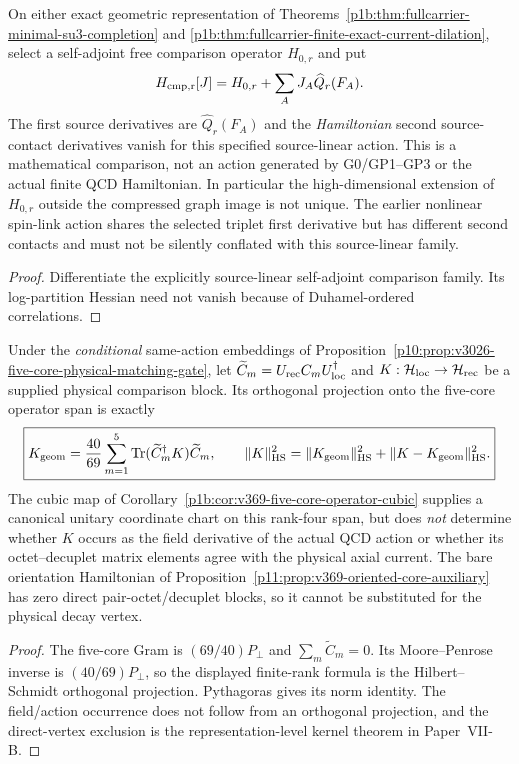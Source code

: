\documentclass[12pt,a4paper]{article}
\begin{document}
\begin{proposition}
\label{p10:prop:fullcarrier-comparison-action-families}
On either exact geometric representation of
Theorems~\ref{p1b:thm:fullcarrier-minimal-su3-completion} and
\ref{p1b:thm:fullcarrier-finite-exact-current-dilation}, select a
self-adjoint free comparison operator $H_{0,r}$ and put
\[
 H_{\rm cmp,r}[J]=H_{0,r}+\sum_AJ_A\widehat Q_r(F_A).
\]
The first source derivatives are $\widehat Q_r(F_A)$ and the
\emph{Hamiltonian} second source-contact derivatives vanish for this
specified source-linear action.  This is a mathematical comparison,
not an action generated by G0/GP1--GP3 or the actual finite QCD
Hamiltonian.  In particular the high-dimensional extension of
$H_{0,r}$ outside the compressed graph image is not unique.
The earlier nonlinear spin-link action shares the selected triplet
first derivative but has different second contacts and must not be
silently conflated with this source-linear family.
\end{proposition}
\begin{proof}
Differentiate the explicitly source-linear self-adjoint comparison
family.  Its log-partition Hessian need not vanish because of
Duhamel-ordered correlations.
\end{proof}

\begin{proposition}
\label{p10:prop:v369-cubic-five-core-projection-firewall}
Under the \emph{conditional} same-action embeddings of
Proposition~\ref{p10:prop:v3026-five-core-physical-matching-gate},
let $\widetilde C_m=U_{\rm rec}C_mU_{\rm loc}^\dagger$ and
$K:\mathcal H_{\rm loc}\to\mathcal H_{\rm rec}$ be a supplied
physical comparison block.  Its orthogonal projection onto the
five-core operator span is exactly
\[
 \boxed{K_{\rm geom}={40\over69}\sum_{m=1}^{5}
 \operatorname{Tr}(\widetilde C_m^\dagger K)\widetilde C_m,\qquad
 \|K\|_{\rm HS}^2=\|K_{\rm geom}\|_{\rm HS}^2
 +\|K-K_{\rm geom}\|_{\rm HS}^2.}
\]
The cubic map of Corollary~\ref{p1b:cor:v369-five-core-operator-cubic}
supplies a canonical unitary coordinate chart on this rank-four
span, but does \emph{not} determine whether $K$ occurs as the
field derivative of the actual QCD action or whether its
octet--decuplet matrix elements agree with the physical axial
current.  The bare orientation Hamiltonian of
Proposition~\ref{p11:prop:v369-oriented-core-auxiliary} has zero
direct pair-octet/decuplet blocks, so it cannot be substituted
for the physical decay vertex.
\end{proposition}
\begin{proof}
The five-core Gram is $(69/40)P_\perp$ and
$\sum_m\widetilde C_m=0$.  Its Moore--Penrose inverse is
$(40/69)P_\perp$, so the displayed finite-rank formula is the
Hilbert--Schmidt orthogonal projection.  Pythagoras gives its norm
identity.  The field/action occurrence does not follow from an
orthogonal projection, and the direct-vertex exclusion is the
representation-level kernel theorem in Paper~VII-B.
\end{proof}
\end{document}
